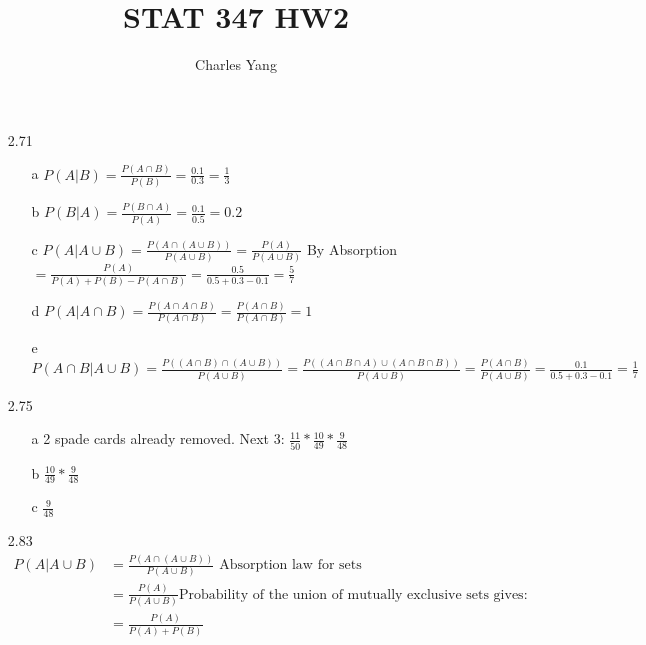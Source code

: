 \documentclass[11pt]{article}
\title{STAT 347 HW2}
\author{Charles Yang}
\begin{document}
    \maketitle

    \begin{enumerate}

        \item[2.71]
        \begin{enumerate}
            \item[a] $P(A|B) = \frac{P(A \cap B)}{P(B)} = \frac{0.1}{0.3} = \frac{1}{3}$
            \item[b] $P(B|A) = \frac{P(B \cap A)}{P(A)} = \frac{0.1}{0.5} = 0.2$
            \item[c] $P(A|A \cup B) = \frac{P(A \cap (A \cup B))}{P(A \cup B)} = \frac{P(A)}{P(A \cup B)} $ By Absorption $= \frac{P(A)}{P(A) + P(B) - P(A \cap B)} = \frac{0.5}{0.5 + 0.3 - 0.1} = \frac{5}{7}$
            \item[d] $P(A|A \cap B) = \frac{P(A \cap A \cap B)}{P(A \cap B)} = \frac{P(A \cap B)}{P(A \cap B)} = 1$
            \item[e] $P(A \cap B|A \cup B) = \frac{P((A \cap B) \cap (A \cup B))}{P(A \cup B)} = \frac{P((A \cap B \cap A) \cup (A \cap B \cap B))}{P(A \cup B)} = \frac{P(A \cap B)}{P(A \cup B)} = \frac{0.1}{0.5 + 0.3 - 0.1} = \frac{1}{7}$
        \end{enumerate}

        \item[2.75]
        \begin{enumerate}
            \item[a] 2 spade cards already removed. Next 3: $\frac{11}{50} * \frac{10}{49} * \frac{9}{48}$
            \item[b] $\frac{10}{49} * \frac{9}{48}$
            \item[c] $\frac{9}{48}$
        \end{enumerate}

        \item[2.83]
        \begin{align*}
            P(A|A \cup B) &= \frac{P(A \cap (A \cup B))}{P(A \cup B)} \text{ Absorption law for sets}\\
            &= \frac{P(A)}{P(A \cup B)} \text{Probability of the union of mutually exclusive sets gives:}\\
            &= \frac{P(A)}{P(A) + P(B)}
        \end{align*}


\end{enumerate}
\end{document}
